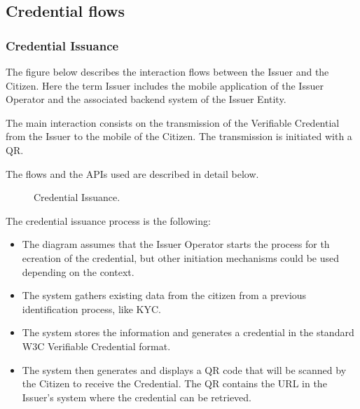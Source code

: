 \documentclass[a4paper,12pt,english]{sphinxhowto}
\begin{document}
\subsection{Credential flows}
\label{\detokenize{ssi/privacycred:credential-flows}}

\subsubsection{Credential Issuance}
\label{\detokenize{ssi/privacycred:credential-issuance}}
\sphinxAtStartPar
The figure below describes the interaction flows between the Issuer and the Citizen. Here the term Issuer includes the mobile application of the Issuer Operator and the associated backend system of the Issuer Entity.

\sphinxAtStartPar
The main interaction consists on the transmission of the Verifiable Credential from the Issuer to the mobile of the Citizen. The transmission is initiated with a QR.

\sphinxAtStartPar
The flows and the APIs used are described in detail below.

\begin{figure}[htbp]
\centering
\capstart

\noindent{}
\caption{Credential Issuance.}\label{\detokenize{ssi/privacycred:id6}}\end{figure}

\sphinxAtStartPar
The credential issuance process is the following:

\sphinxAtStartPar
{}
\begin{itemize}
\item {} 
\sphinxAtStartPar
The diagram assumes that the Issuer Operator starts the process for th ecreation of the credential, but other initiation mechanisms could be used depending on the context.

\item {} 
\sphinxAtStartPar
The system gathers existing data from the citizen from a previous identification process, like KYC.

\item {} 
\sphinxAtStartPar
The system stores the information and generates a credential in the standard W3C Verifiable Credential format.

\item {} 
\sphinxAtStartPar
The system then generates and displays a QR code that will be scanned by the Citizen to receive the Credential. The QR contains the URL in the Issuer’s system where the credential can be retrieved.

\end{itemize}
\end{document}
